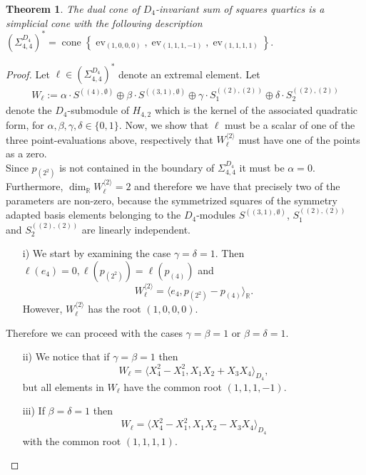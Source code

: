 \documentclass[11pt,a4paper]{amsart}
\numberwithin{equation}{section}
\newtheorem{thm}{Theorem}
\theoremstyle{definition}
\newcommand{\R}{\mathbb{R}}
\DeclareMathOperator{\ev}{ev}
\DeclareMathOperator{\cone}{cone}
\numberwithin{thm}{section}
\theoremstyle{break}
\numberwithin{subcase}{case}
\begin{document}
\begin{thm}
\label{thm:D4simplicialCone} The dual cone of $D_4$-invariant sum of squares quartics is a simplicial cone with the following description
$\left(\Sigma_{4,4}^{D_4}\right)^\ast = \cone \left\{ \ev_{(1,0,0,0)},\ev_{(1,1,1,-1)}, \ev_{(1,1,1,1)} \right\}.$
\end{thm} 
\begin{proof}
Let $\ell \in \left( \Sigma_{4,4}^{D_4}\right)^\ast$ denote an extremal element. Let \begin{align*}
    W_\ell := \alpha \cdot S^{((4),\emptyset)} \oplus \beta \cdot S^{((3,1),\emptyset)} \oplus \gamma \cdot S_1^{((2),(2))} \oplus \delta \cdot S_2^{((2),(2))} 
\end{align*} denote the $D_4$-submodule of $H_{4,2}$ which is the kernel of the associated quadratic form, for $\alpha,\beta,\gamma,\delta \in \{0,1\}$. Now, we show that $\ell$ must be a scalar of one of the three point-evaluations above, respectively that $W_\ell^{\langle 2\rangle}$ must have one of the points as a zero. \\
Since $p_{(2^2)}$ is not contained in the boundary of $\Sigma_{4,4}^{D_4}$ it must be $\alpha = 0$. Furthermore, $\dim_\R W_\ell^{\langle 2 \rangle} = 2$ and therefore we have that precisely two of the parameters are non-zero, because the symmetrized squares of the symmetry adapted basis elements belonging to the $D_4$-modules $S^{((3,1),\emptyset)}$, $S_1^{((2),(2))}$ and $S_2^{((2),(2))}$ are linearly independent. 
\begin{itemize}
    \item[i)] We start by examining the case $\gamma = \delta  = 1$. Then $\ell (e_4) = 0, \ell (p_{(2^2)}) = \ell (p_{(4)})$ and $$W_\ell^{\langle 2 \rangle } = \langle e_4,p_{(2^2)}-p_{(4)} \rangle_\R.$$ However, $W_\ell^{\langle 2 \rangle}$ has the root $(1,0,0,0)$.
\end{itemize}
Therefore we can proceed with the cases $\gamma = \beta = 1$ or $\beta = \delta = 1$. 
\begin{itemize}
    \item[ii)] We notice that if $\gamma = \beta = 1$ then $$W_\ell = \langle X_4^2-X_1^2, X_1X_2+X_3X_4 \rangle_{D_4},$$ but all elements in $W_\ell$ have the common root $(1,1,1,-1)$.
    \item[iii)] If $\beta = \delta = 1$ then $$W_\ell = \langle X_4^2-X_1^2,X_1X_2-X_3X_4\rangle_{D_4}$$ with the common root $(1,1,1,1)$.
\end{itemize}
\end{proof}
\end{document}
